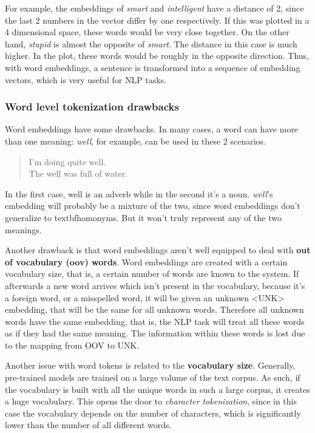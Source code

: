 For example, the embeddings of \emph{smart} and \emph{intelligent} have a distance of 2, since the last 2 numbers in the vector differ by one respectively. If this was plotted in a 4 dimensional space, these words would be very close together. On the other hand, \emph{stupid} is almost the opposite of \emph{smart}. The distance in this case is much higher. In the plot, these words would be roughly in the opposite direction. Thus, with word embeddings, a sentence is transformed into a sequence of embedding vectors, which is very useful for NLP tasks.

\subsubsection{Word level tokenization drawbacks}

Word embeddings have some drawbacks. In many cases, a word can have more than one meaning: \emph{well}, for example, can be used in these 2 scenarios.

\begin{quote}
    I'm doing quite well.\\
    The well was full of water.
\end{quote}

In the first case, well is an adverb while in the second it's a noun. \emph{well}'s embedding will probably be a mixture of the two, since word embeddings don't generalize to textbf{homonyms}. But it won't truly represent any of the two meanings.

Another drawback is that word embeddings aren't well equipped to deal with \textbf{out of vocabulary (oov) words}. Word embeddings are created with a certain vocabulary size, that is, a certain number of words are known to the system. If afterwards a new word arrives which isn't present in the vocabulary, because it's a foreign word, or a misspelled word, it will be given an unknown <UNK> embedding, that will be the same for all unknown words. Therefore all unknown words have the same embedding, that is, the NLP task will treat all these words as if they had the same meaning. The information within these words is lost due to the mapping from OOV to UNK.

Another issue with word tokens is related to the \textbf{vocabulary size}. Generally, pre-trained models are trained on a large volume of the text corpus. As such, if the vocabulary is built with all the unique words in such a large corpus, it creates a huge vocabulary. This opens the door to \emph{character tokenization}, since in this case the vocabulary depends on the number of characters, which is significantly lower than the number of all different words.

